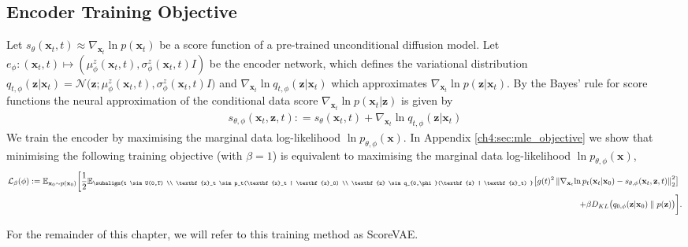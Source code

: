 \subsection{Encoder Training Objective}\label{ch4:Encoder_Training_Objective}
Let $s_\theta(\textbf{x}_t, t) \approx \nabla_{\textbf{x}_t}  \ln{p(\textbf{x}_t)}  $ be a score function of a pre-trained unconditional diffusion model. Let $e_\phi: (\textbf{x}_t, t) \mapsto (\mu_\phi^z(\textbf{x}_t, t), \sigma^z_\phi(\textbf{x}_t, t)I)$ be the encoder network, which defines the variational distribution $q_{t, \phi}(\textbf{z} | \textbf{x}_t) = \mathcal{N}\big( \textbf{z} ; \mu_\phi^z(\textbf{x}_t, t), \sigma^z_\phi(\textbf{x}_t, t)I \big)$ and $\nabla_{\textbf{x}_t} \ln q_{t, \phi}(\textbf{z} | \textbf{x}_t)  $ which approximates $\nabla_{\textbf{x}_t}  \ln{p(\textbf{z} | \textbf{x}_t )}$. By the Bayes' rule for score functions the neural approximation of the conditional data score  $\nabla_{\textbf{x}_t}  \ln{p(\textbf{x}_t | \textbf{z})}$ is given by
\begin{gather*}
s_{\theta, \phi}(\textbf{x}_t, \textbf{z}, t) : = s_\theta(\textbf{x}_t, t) + \nabla_{\textbf{x}_t} \ln q_{t, \phi}(\textbf{z} | \textbf{x}_t)    
\end{gather*}
 We train the encoder by maximising the marginal data log-likelihood $\ln p_{\theta, \phi}(\textbf{x}) $.
In Appendix \ref{ch4:sec:mle_objective} we show that minimising the following training objective (with $\beta=1$) is equivalent to maximising the marginal data log-likelihood $\ln p_{\theta, \phi}(\textbf{x}) $,
\begin{equation*}
\begin{aligned}
    \mathcal{L}_\beta(\phi)  := \mathbb{E}_{\textbf{x}_0 \sim p(\textbf{x}_0)} \bigg[ 
    \frac{1}{2} \mathbb{E}_{\subalign{t \sim U(0,T) \\ \textbf{x}_t \sim p_t(\textbf{x}_t | \textbf{x}_0) \\ \textbf{z} \sim q_{0,\phi}(\textbf{z} | \textbf{x}_t) }} 
    \big[
    g(t)^2  \norm{ \nabla_{\textbf{x}_t}{\ln{p_t(\textbf{x}_t | \textbf{x}_0)}} - s_{\theta, \phi}(\textbf{x}_t, \textbf{z}, t)}_2^2  
    & \big] \\
    + \beta D_{KL}\big( q_{0,\phi}(\textbf{z} | \textbf{x}_0)  \parallel p(\textbf{z})\big)  & \bigg].
\end{aligned}    
\end{equation*}

For the remainder of this chapter, we will refer to this training method as ScoreVAE.

